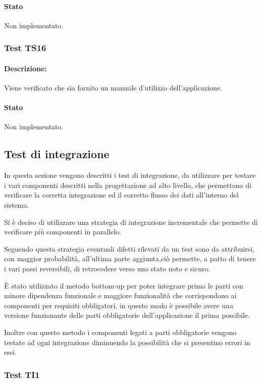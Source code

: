 \documentclass[../PianoDiQualifica.tex]{subfiles}
\begin{document}
	\paragraph{Stato} Non implementato.
	
	\subsubsection{Test TS16} 
	\paragraph{Descrizione:} Viene verificato che sia fornito un manuale d'utilizzo dell'applicazione.
	\paragraph{Stato} Non implementato.
	
	
	\subsection{Test di integrazione} 
	In questa sezione vengono descritti i test di integrazione, da utilizzare per testare i vari componenti descritti nella progettazione ad alto livello, che permettono di verificare la corretta integrazione ed il corretto flusso dei dati all'interno del sistema.
	
	Si è deciso di utilizzare una strategia di integrazione incrementale che permette di verificare più componenti in parallelo.
	
	Seguendo questa strategia eventuali difetti rilevati da un test sono da attribuirsi, con maggior probabilità, all’ultima parte aggiunta,ciò permette, a patto di tenere i vari passi reversibili, di retrocedere verso uno stato noto e sicuro.
	
	È stato utilizzato il metodo bottom-up per poter integrare prima le parti con minore dipendenza funzionale e maggiore funzionalità che corrispondono ai componenti per requisiti obbligatori, in questo modo è possibile avere una versione funzionante delle parti obbligatorie dell’applicazione il prima possibile.
	
	Inoltre con questo metodo i componenti legati a parti obbligatorie vengono testate ad ogni integrazione diminuendo la possibilità che si presentino errori in essi.
	
	
	
	\subsubsection{Test TI1}
\end{document}
